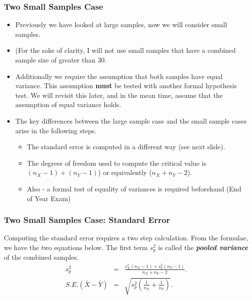

\subsubsection{Two Small Samples Case}
\begin{itemize}
\item Previously we have looked at large samples, now we will consider small samples.
\item (For the sake of clarity, I will not use small samples that have a combined sample size of greater than 30.
\item Additionally we require the assumption that both samples have equal variance. This assumption \textbf{must} be tested with another formal hypothesis test. We will revisit this later, and in the mean time, assume that the assumption of equal variance holds.
\end{itemize}


\begin{itemize}
\item The key differences between the large sample case and the small sample cases arise in the following steps.
\begin{itemize}
\item The standard error is computed in a different way (see next slide).
\item The degrees of freedom used to compute the critical value is $(n_X-1) + (n_Y - 1)$) or equivalently ($n_X + n_Y - 2$).
\item Also - a formal test of equality of variances is required beforehand (End of Year Exam)
\end{itemize}
\end{itemize}


\subsubsection{Two Small Samples Case: Standard Error}
Computing the standard error requires a two step calculation. From the formulae, we have the two equations below. The first term $s_p^2$ is called the \textbf{\textit{pooled variance}} of the combined samples.
\begin{eqnarray*}
s_p^2&=&\frac{s_X^2(n_X-1)+s_Y^2(n_Y-1)}{n_X+n_Y-2}.\\
S.E.(\bar{X}-\bar{Y})&=&\sqrt{s_p^2\left(\frac{1}{n_X}+\frac{1}{n_Y}\right)}.\\
\end{eqnarray*}






